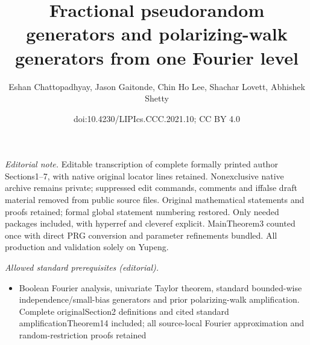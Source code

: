 \documentclass[10pt,a4paper]{article}
\title{Fractional pseudorandom generators and polarizing-walk generators from one Fourier level}
\author{Eshan Chattopadhyay, Jason Gaitonde, Chin Ho Lee, Shachar Lovett, Abhishek Shetty}
\date{doi:10.4230/LIPIcs.CCC.2021.10; CC BY 4.0}
\theoremstyle{definition}
\begin{document}
\maketitle
\noindent\textit{Editorial note.} Editable transcription of complete formally printed author Sections1–7, with native original locator lines retained. Nonexclusive native archive remains private; suppressed edit commands, comments and iffalse draft material removed from public source files. Original mathematical statements and proofs retained; formal global statement numbering restored. Only needed packages included, with hyperref and cleveref explicit. MainTheorem3 counted once with direct PRG conversion and parameter refinements bundled. All production and validation solely on Yupeng.\par\medskip
\noindent\textit{Allowed standard prerequisites (editorial).}\begin{itemize}
\item Boolean Fourier analysis, univariate Taylor theorem, standard bounded-wise independence/small-bias generators and prior polarizing-walk amplification. Complete originalSection2 definitions and cited standard amplificationTheorem14 included; all source-local Fourier approximation and random-restriction proofs retained
\end{itemize}\medskip
\end{document}

